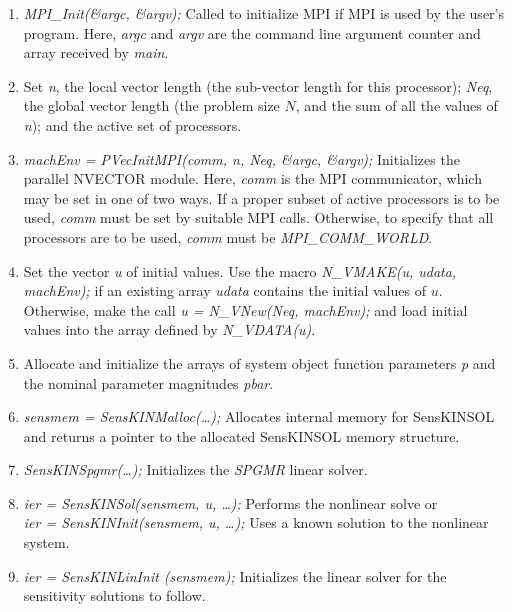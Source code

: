 \documentclass[11pt]{article}
\begin{document}
\begin{enumerate}

\item {\em MPI\_Init(\&argc, \&argv);} Called to initialize MPI if MPI
is used by the user's program.  Here, {\em argc} and {\em argv} are the
command line argument counter and array received by {\em main}.

\item Set {\em n}, the local vector length (the sub-vector length for
this processor); {\em Neq}, the global vector length (the problem size
$N$, and the sum of all the values of {\em n}); and the active set
of processors.

\item {\em machEnv = PVecInitMPI(comm, n, Neq, \&argc, \&argv);}
Initializes the parallel NVECTOR module.  Here, {\em comm} is the MPI
communicator, which may be set in one of two ways. If a proper subset
of active processors is to be used, {\em comm} must be set by suitable
MPI calls.  Otherwise, to specify that all processors are to be used,
{\em comm} must be {\em MPI\_COMM\_WORLD}.

\item Set the vector {\em u} of initial values.  Use the macro {\em
N\_VMAKE(u, udata, machEnv);} if an existing array {\em udata}
contains the initial values of $u$.  Otherwise, make the call {\em u =
N\_VNew(Neq, machEnv);} and load initial values into the array defined
by {\em N\_VDATA(u)}.

\item Allocate and initialize the arrays of system object function
parameters {\em p} and the nominal parameter magnitudes {\em pbar}.

\item {\em sensmem = SensKINMalloc(\ldots);} Allocates internal memory
for SensKINSOL and returns a pointer to the allocated SensKINSOL
memory structure.

\item {\em SensKINSpgmr(\ldots);} Initializes the {\em SPGMR} linear
solver.

\item {\em ier = SensKINSol(sensmem, u, \ldots );} Performs the nonlinear
solve or \\ {\em ier = SensKINInit(sensmem, u, \ldots );} Uses a known
solution to the nonlinear system.

\item {\em ier = SensKINLinInit (sensmem);} Initializes the linear
solver for the sensitivity solutions to follow.


\end{enumerate}
\end{document}
